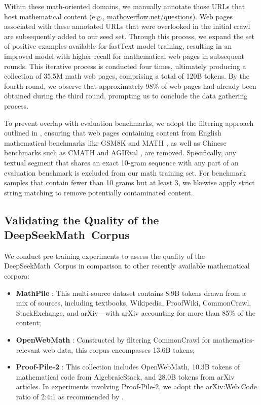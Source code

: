 Within these math-oriented domains, we manually annotate those URLs that host mathematical content (e.g., \url{mathoverflow.net/questions}). Web pages associated with these annotated URLs that were overlooked in the initial crawl are subsequently added to our seed set. Through this process, we expand the set of positive examples available for fastText model training, resulting in an improved model with higher recall for mathematical web pages in subsequent rounds. This iterative process is conducted four times, ultimately producing a collection of 35.5M math web pages, comprising a total of 120B tokens. By the fourth round, we observe that approximately 98\% of web pages had already been obtained during the third round, prompting us to conclude the data gathering process.

To prevent overlap with evaluation benchmarks, we adopt the filtering approach outlined in \cite{deepseek-coder}, ensuring that web pages containing content from English mathematical benchmarks like GSM8K \citep{gsm8k} and MATH \citep{MATH}, as well as Chinese benchmarks such as CMATH \citep{wei2023cmath} and AGIEval \citep{agieval}, are removed. Specifically, any textual segment that shares an exact 10-gram sequence with any part of an evaluation benchmark is excluded from our math training set. For benchmark samples that contain fewer than 10 grams but at least 3, we likewise apply strict string matching to remove potentially contaminated content.

\subsection{Validating the Quality of the DeepSeekMath~Corpus}

We conduct pre-training experiments to assess the quality of the DeepSeekMath~Corpus in comparison to other recently available mathematical corpora:

\begin{itemize}[topsep=0pt]
    \item \textbf{MathPile} \citep{mathpile}: This multi-source dataset contains 8.9B tokens drawn from a mix of sources, including textbooks, Wikipedia, ProofWiki, CommonCrawl, StackExchange, and arXiv—with arXiv accounting for more than 85\% of the content;
    \item \textbf{OpenWebMath} \citep{openwebmath}: Constructed by filtering CommonCrawl for mathematics-relevant web data, this corpus encompasses 13.6B tokens;
    \item \textbf{Proof-Pile-2} \citep{llemma}: This collection includes OpenWebMath, 10.3B tokens of mathematical code from AlgebraicStack, and 28.0B tokens from arXiv articles. In experiments involving Proof-Pile-2, we adopt the arXiv:Web:Code ratio of 2:4:1 as recommended by \cite{llemma}.
\end{itemize}

